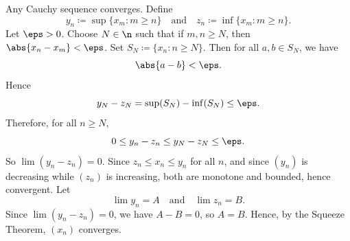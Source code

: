 \begin{theorem}{
    Any Cauchy sequence converges.
}
    Define
    \[
        y_n \coloneqq \sup\{x_m : m\geq n\}
        \quad\text{and}\quad
        z_n \coloneqq \inf\{x_m : m\geq n\}.
    \]
    Let $\eps > 0$.
    Choose $N\in\n$ such that if $m,n\geq N$, then $\abs{x_n - x_m} < \eps$.
    Set $S_N \coloneqq \{x_n : n\geq N\}$.
    Then for all $a,b\in S_N$, we have
    \[
        \abs{a-b}<\eps.
    \]
    Hence
    \[
        y_N - z_N = \sup(S_N) - \inf(S_N) \leq \eps.
    \]
    Therefore, for all $n\geq N$,
    \[
        0\leq y_n - z_n \leq y_N - z_N \leq \eps.
    \]
    So $\lim (y_n - z_n) = 0$.
    Since $z_n \leq x_n \leq y_n$ for all $n$, and since $(y_n)$ is decreasing while $(z_n)$ is increasing, both are monotone and bounded, hence convergent.
    Let
    \[
        \lim y_n = A
        \quad\text{and}\quad
        \lim z_n = B.
    \]
    Since $\lim (y_n-z_n)=0$, we have $A-B=0$, so $A=B$.
    Hence, by the Squeeze Theorem, $(x_n)$ converges.
\end{theorem}